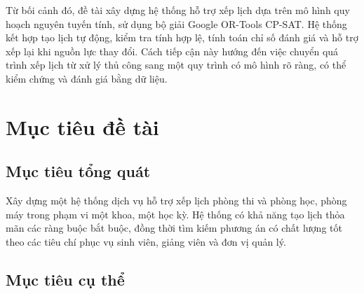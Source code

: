 Từ bối cảnh đó, đề tài xây dựng hệ thống hỗ trợ xếp lịch dựa trên mô hình quy hoạch nguyên tuyến tính, sử dụng bộ giải Google OR-Tools CP-SAT. Hệ thống kết hợp tạo lịch tự động, kiểm tra tính hợp lệ, tính toán chỉ số đánh giá và hỗ trợ xếp lại khi nguồn lực thay đổi. Cách tiếp cận này hướng đến việc chuyển quá trình xếp lịch từ xử lý thủ công sang một quy trình có mô hình rõ ràng, có thể kiểm chứng và đánh giá bằng dữ liệu.

\section{Mục tiêu đề tài}
\label{sec:muc-tieu}

\subsection{Mục tiêu tổng quát}

Xây dựng một hệ thống dịch vụ hỗ trợ xếp lịch phòng thi và phòng học, phòng máy trong phạm vi một khoa, một học kỳ. Hệ thống có khả năng tạo lịch thỏa mãn các ràng buộc bắt buộc, đồng thời tìm kiếm phương án có chất lượng tốt theo các tiêu chí phục vụ sinh viên, giảng viên và đơn vị quản lý.

\subsection{Mục tiêu cụ thể}

